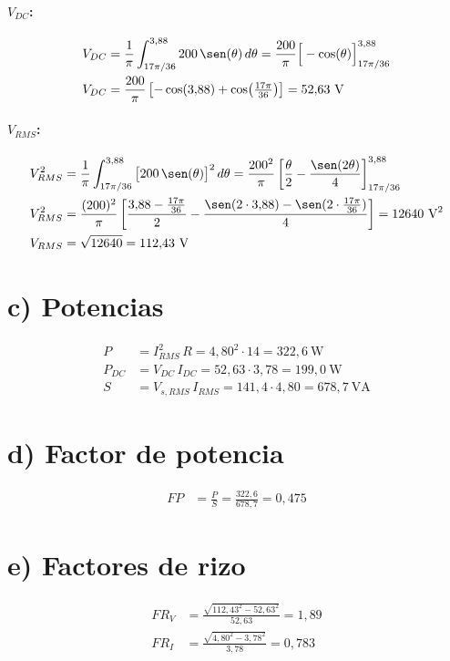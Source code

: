 \documentclass[11pt]{article}
\begin{document}
\paragraph{$V_{DC}$:}
\begin{align*}
V_{DC} &= \frac{1}{\pi}\int_{17\pi/36}^{3{,}88} 200\,\sen(\theta)\,d\theta
       = \frac{200}{\pi}\Big[-\cos(\theta)\Big]_{17\pi/36}^{3{,}88} \\
V_{DC} &= \frac{200}{\pi}\left[-\cos(3{,}88)+\cos\!\left(\tfrac{17\pi}{36}\right)\right] = 52{,}63\ \text{V}
\end{align*}

\paragraph{$V_{RMS}$:}
\begin{align*}
V_{RMS}^2 &= \frac{1}{\pi}\int_{17\pi/36}^{3{,}88} \big[200\,\sen(\theta)\big]^2\,d\theta
          = \frac{200^2}{\pi}\left[\frac{\theta}{2}-\frac{\sen(2\theta)}{4}\right]_{17\pi/36}^{3{,}88} \\
V_{RMS}^2 &= \frac{(200)^2}{\pi}\left[\frac{3{,}88-\tfrac{17\pi}{36}}{2} - \frac{\sen(2\cdot 3{,}88)-\sen(2\cdot\tfrac{17\pi}{36})}{4}\right] = 12640\ \text{V}^2 \\
V_{RMS} &= \sqrt{12640} = 112{,}43\ \text{V}
\end{align*}

\section*{c) Potencias}

\begin{align*}
P &= I_{RMS}^2\,R = 4{,}80^2 \cdot 14 = 322{,}6\ \text{W} \\
P_{DC} &= V_{DC}\,I_{DC} = 52{,}63 \cdot 3{,}78 = 199{,}0\ \text{W} \\
S &= V_{s,RMS}\,I_{RMS} = 141{,}4 \cdot 4{,}80 = 678{,}7\ \text{VA}
\end{align*}

\section*{d) Factor de potencia}

\begin{align*}
FP &= \frac{P}{S} = \frac{322{,}6}{678{,}7} = 0{,}475
\end{align*}

\section*{e) Factores de rizo}

\begin{align*}
FR_V &= \frac{\sqrt{112{,}43^2 - 52{,}63^2}}{52{,}63} = 1{,}89 \\
FR_I &= \frac{\sqrt{4{,}80^2 - 3{,}78^2}}{3{,}78} = 0{,}783
\end{align*}
\end{document}
